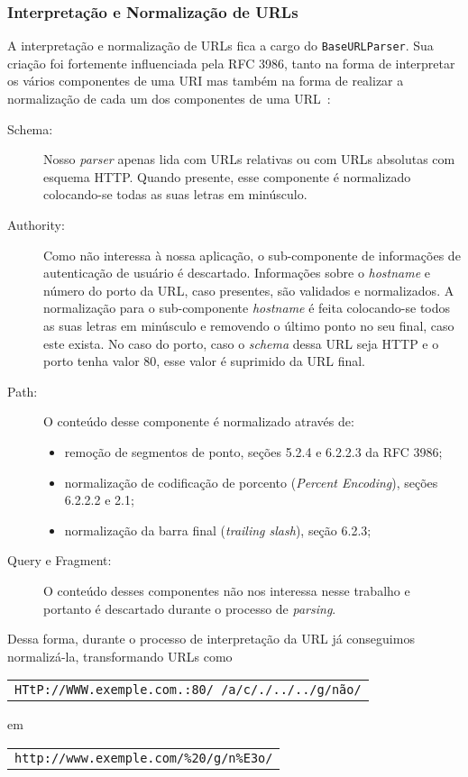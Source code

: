 \documentclass[10pt,twocolumn]{article}
\begin{document}
\subsubsection{Interpretação e Normalização de URLs}

A interpretação e normalização de URLs fica a cargo do
\texttt{BaseURLParser}. Sua criação foi fortemente influenciada pela RFC
3986, tanto na forma de interpretar os vários componentes de uma URI mas
também na forma de realizar a normalização de cada um dos componentes de
uma URL~\cite{rfc3986}:

\begin{description}
\item[Schema:] Nosso \emph{parser} apenas lida com URLs relativas ou com URLs
absolutas com esquema HTTP. Quando presente, esse componente é
normalizado colocando-se todas as suas letras em minúsculo.

\item[Authority:] Como não interessa à nossa aplicação, o sub-componente de
informações de autenticação de usuário é descartado. Informações sobre
o \emph{hostname} e número do porto da URL, caso presentes, são
validados e normalizados. A normalização para o sub-componente
\emph{hostname} é feita colocando-se todos as suas letras em minúsculo e
removendo o último ponto no seu final, caso este exista. No caso do
porto, caso o \emph{schema} dessa URL seja HTTP e o porto tenha valor
80, esse valor é suprimido da URL final.

\item[Path:] O conteúdo desse componente é normalizado através de:
    \begin{itemize}
    \item  remoção de segmentos de ponto, seções 5.2.4 e 6.2.2.3 da RFC 3986;
    \item  normalização de codificação de porcento (\emph{Percent Encoding}), 
           seções 6.2.2.2 e 2.1;
    \item  normalização da barra final (\emph{trailing slash}), seção
           6.2.3;
    \end{itemize}

\item[Query e Fragment:] O conteúdo desses componentes não nos interessa
nesse trabalho e portanto é descartado durante o processo de
\emph{parsing}.

\end{description}

Dessa forma, durante o processo de interpretação da URL já conseguimos
normalizá-la, transformando URLs como
\begin{tabular}{c}
\texttt{\small HTtP://WWW.exemple.com.:80/ /a/c/./../../g/não/}
\end{tabular}
em
\begin{tabular}{c}
\texttt{\small http://www.exemple.com/\%20/g/n\%E3o/}
\end{tabular}
\end{document}
